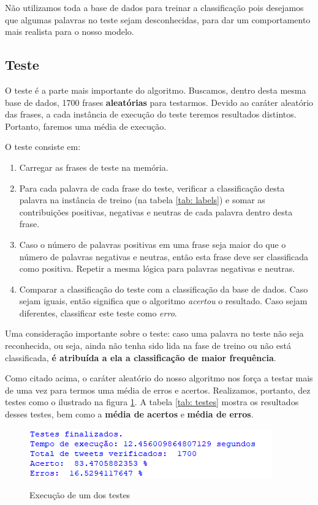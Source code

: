 \documentclass[
article,			%
12pt,				%
a4paper,			%
english,			%
brazil,				%
sumario=tradicional,
twoside
]{abntex2}
\begin{document}
	Não utilizamos toda a base de dados para treinar a classificação pois desejamos que algumas palavras no teste sejam desconhecidas, para dar um comportamento mais realista para o nosso modelo.
	
	\subsection{Teste}
	
	\label{teste}
	O teste é a parte mais importante do algoritmo. Buscamos, dentro desta mesma base de dados, 1700 frases \textbf{aleatórias} para testarmos. Devido ao caráter aleatório das frases, a cada instância de execução do teste teremos resultados distintos. Portanto, faremos uma média de execução.
	
	O teste consiste em:
	\begin{enumerate}
		\item Carregar as frases de teste na memória.
		\item Para cada palavra de cada frase do teste, verificar a classificação desta palavra na instância de treino (na tabela \ref{tab: labels}) e somar as contribuições positivas, negativas e neutras de cada palavra dentro desta frase.
		\item Caso o número de palavras positivas em uma frase seja maior do que o número de palavras negativas e neutras, então esta frase deve ser classificada como positiva. Repetir a mesma lógica para palavras negativas e neutras.
		\item Comparar a classificação do teste com a classificação da base de dados. Caso sejam iguais, então significa que o algoritmo \emph{acertou} o resultado. Caso sejam diferentes, classificar este teste como \emph{erro}.
	\end{enumerate}

		Uma consideração importante sobre o teste: caso uma palavra no teste não seja reconhecida, ou seja, ainda não tenha sido lida na fase de treino ou não está classificada, \textbf{é atribuída a ela a classificação de maior frequência}.
		
		Como citado acima, o caráter aleatório do nosso algoritmo nos força a testar mais de uma vez para termos uma média de erros e acertos. Realizamos, portanto, dez testes como o ilustrado na figura \ref{fig: teste1}. A tabela \ref{tab: testes} mostra os resultados desses testes, bem como a \textbf{média de acertos} e \textbf{média de erros}.  
		
		\begin{figure}[h!]
			\centering
			\caption{Execução de um dos testes}
			\includegraphics[scale=1]{teste1.png}
			\label{fig: teste1}
		\end{figure}
	
\end{document}
